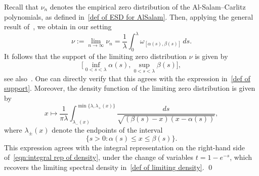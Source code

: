 \documentclass{amsart}
\theoremstyle{plain}
\theoremstyle{remark}
\numberwithin{equation}{section}
\begin{document}
Recall that \( \nu_n \) denotes the empirical zero distribution of the Al-Salam--Carlitz polynomials, as defined in~\eqref{def of ESD for AlSalam}. Then, applying the general result of~\cite[Theorem~1.4]{KA99}, we obtain in our setting
\begin{equation}
    \nu := \lim_{n \to \infty} \nu_n = \frac{1}{\lambda} \int_0^\lambda \omega_{[\alpha(s), \beta(s)]} \, ds.
\end{equation}
It follows that the support of the limiting zero distribution \( \nu \) is given by
\begin{equation}
    \Big[ \inf_{0 < s < \lambda} \alpha(s), \sup_{0 < s < \lambda} \beta(s) \Big],
\end{equation}
see also~\cite[Eq.~(1.10)]{KA99}. One can directly verify that this agrees with the expression in~\eqref{def of support}.
Moreover, the density function of the limiting zero distribution is given by
\begin{equation}
    x \mapsto \frac{1}{\pi \lambda} \int_{\lambda_{-}(x)}^{\min\{ \lambda, \lambda_{+}(x) \}} \frac{ds}{\sqrt{ (\beta(s) - x)(x - \alpha(s)) }},
\end{equation} 
where \( \lambda_{\pm}(x) \) denote the endpoints of the interval
\[
\{ s > 0 : \alpha(s) \leq x \leq \beta(s) \}.
\]
This expression agrees with the integral representation on the right-hand side of~\eqref{eqn:integral rep of density}, under the change of variables \( t = 1 - e^{-s} \), which recovers the limiting spectral density in~\eqref{def of limiting density}. \qed












 
\end{document}
